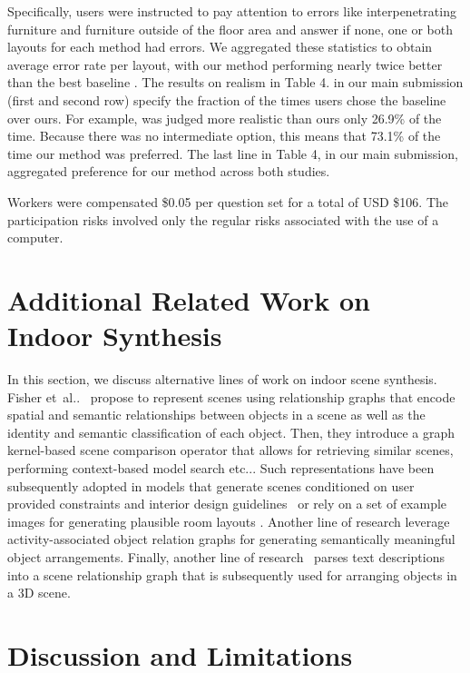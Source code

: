 \documentclass{article}
\makeatletter
\DeclareRobustCommand\onedot{\futurelet\@let@token\@onedot}
\def\@onedot{\ifx\@let@token.\else.\null\fi\xspace}
\def\etc{etc\onedot}
\def\etal{et~al\onedot}
\makeatother
\begin{document}
Specifically,
users were instructed to pay attention to errors like interpenetrating
furniture and furniture outside of the floor area and answer if none, one or
both layouts for each method had errors. We aggregated these statistics to
obtain average error rate per layout, with our method performing nearly twice
better than the best baseline \cite{Ritchie2019CVPR}. The results on realism in Table 4.
in our main submission (first and second row) specify the fraction of the times users chose the
baseline over ours. For example, \cite{Ritchie2019CVPR} was judged more
realistic than ours only 26.9\% of the time. Because there was no intermediate
option, this means that 73.1\% of the time our method was preferred. The last
line in Table 4, in our main submission, aggregated preference for our method
across both studies.

Workers were compensated \$0.05 per question set for a total of USD \$106. The
participation risks involved only the regular risks associated with the use of
a computer.



\section{Additional Related Work on Indoor Synthesis}

In this section, we discuss alternative lines of work on indoor scene
synthesis. Fisher \etal~\cite{Fisher2011SIGGRAPH} propose to represent scenes
using relationship graphs that encode spatial and semantic relationships between
objects in a scene as well as the identity and semantic classification of each
object. Then, they introduce a graph kernel-based scene comparison operator
that allows for retrieving similar scenes, performing context-based model
search \etc. Such representations have been subsequently adopted in models that generate
scenes conditioned on user provided constraints and interior design
guidelines~\cite{Merrell2011SIGGRAPH} or rely on a set of example images 
for generating plausible room layouts \cite{Fisher2012SIGGRAPHASIA}. Another line of research
\cite{Fisher2015SIGGRPAPH, Fu2017SIGGRAPH} leverage activity-associated object
relation graphs for generating semantically meaningful object arrangements.
Finally, another line of research~\cite{Chang2014EMNLP, Ma2018SIGGRAPH} parses
text descriptions into a scene relationship graph that is subsequently used for
arranging objects in a 3D scene.


\section{Discussion and Limitations}
\end{document}
